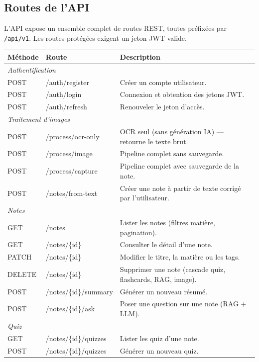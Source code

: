 \documentclass[12pt,a4paper]{report}
\begin{document}
\subsection{Routes de l'API}

L'API expose un ensemble complet de routes REST, toutes préfixées par \texttt{/api/v1}. Les routes protégées exigent un jeton JWT valide.

\begin{table}[H]
\centering
\begin{tabularx}{\textwidth}{|p{1.5cm}|p{5.5cm}|X|}
\hline
\textbf{Méthode} & \textbf{Route} & \textbf{Description}\\
\hline
\multicolumn{3}{|l|}{\textit{Authentification}}\\
\hline
POST & /auth/register & Créer un compte utilisateur.\\
POST & /auth/login & Connexion et obtention des jetons JWT.\\
POST & /auth/refresh & Renouveler le jeton d'accès.\\
\hline
\multicolumn{3}{|l|}{\textit{Traitement d'images}}\\
\hline
POST & /process/ocr-only & OCR seul (sans génération IA) — retourne le texte brut.\\
POST & /process/image & Pipeline complet sans sauvegarde.\\
POST & /process/capture & Pipeline complet avec sauvegarde de la note.\\
POST & /notes/from-text & Créer une note à partir de texte corrigé par l'utilisateur.\\
\hline
\multicolumn{3}{|l|}{\textit{Notes}}\\
\hline
GET & /notes & Lister les notes (filtres matière, pagination).\\
GET & /notes/\{id\} & Consulter le détail d'une note.\\
PATCH & /notes/\{id\} & Modifier le titre, la matière ou les tags.\\
DELETE & /notes/\{id\} & Supprimer une note (cascade quiz, flashcards, RAG, image).\\
POST & /notes/\{id\}/summary & Générer un nouveau résumé.\\
POST & /notes/\{id\}/ask & Poser une question sur une note (RAG + LLM).\\
\hline
\multicolumn{3}{|l|}{\textit{Quiz}}\\
\hline
GET & /notes/\{id\}/quizzes & Lister les quiz d'une note.\\
POST & /notes/\{id\}/quizzes & Générer un nouveau quiz.\\

\end{tabularx}
\end{table}
\end{document}
